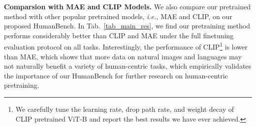 \documentclass[10pt,twocolumn,letterpaper]{article}
\begin{document}
\noindent \textbf{Comparsion with MAE and CLIP Models.} We also compare our pretrained method with other popular pretrained models, \emph{i.e.,} MAE and CLIP, on our proposed HumanBench. In Tab.~\ref{tab_main_res}, we find our pretraining method performs considerably better than CLIP and MAE under the full finetuning evaluation protocol on all tasks. Interestingly, the performance of CLIP\footnote{We carefully tune the learning rate, drop path rate, and weight decay of CLIP pretrained ViT-B and report the best results we have ever achieved.} is lower than MAE, which shows that more data on natural images and languages may not naturally benefit a variety of human-centric tasks, which empirically validates the importance of our HumanBench for further research on human-centric pretraining. 






\begin{table}[t]
 \footnotesize
  \centering
  \caption{Ablation results.  "A", "S", and "T" respectively denote all shared, specific, and task-shared projector.  indicates the results are reported as 1-heavy occluded MR for averaging.}
    \vspace{-2em}
  \label{tab_ablation}\end{table} 
\end{document}
